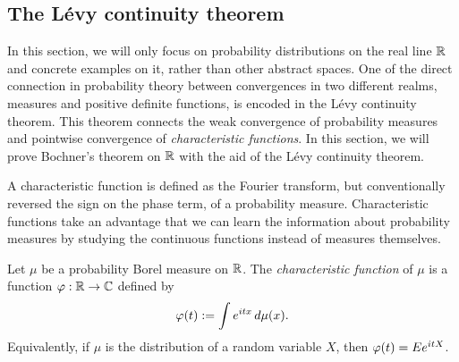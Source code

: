 \documentclass[a4paper]{article}
\begin{document}
\subsection{The L\'evy continuity theorem}

In this section, we will only focus on probability distributions on the real line $\mathbb{R}$ and concrete examples on it, rather than other abstract spaces.
One of the direct connection in probability theory between convergences in two different realms, measures and positive definite functions, is encoded in the L\'evy continuity theorem.
This theorem connects the weak convergence of probability measures and pointwise convergence of \emph{characteristic functions}.
In this section, we will prove Bochner's theorem on $\mathbb{R}$ with the aid of the L\'evy continuity theorem.

A characteristic function is defined as the Fourier transform, but conventionally reversed the sign on the phase term, of a probability measure.
Characteristic functions take an advantage that we can learn the information about probability measures by studying the continuous functions instead of measures themselves.

\begin{defn}
Let $\mu$ be a probability Borel measure on $\mathbb{R}$.
The \emph{characteristic function} of $\mu$ is a function $\varphi:\mathbb{R}\to\mathbb{C}$ defined by
\[\varphi(t):=\int e^{itx}\,d\mu(x).\]
Equivalently, if $\mu$ is the distribution of a random variable $X$, then $\varphi(t)=Ee^{itX}$.
\end{defn}
\end{document}
